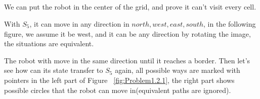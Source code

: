 \documentclass[paper=a4, fontsize=11pt]{scrartcl} %
\numberwithin{equation}{section} %
\numberwithin{figure}{section} %
\numberwithin{table}{section} %
\begin{document}

\subsection{}

We can put the robot in the center of the grid, and prove it can't visit every cell.

With $S_5$, it can move in any direction in ${north, west, east, south}$, in the following figure, 
we assume it be west, and it can be any direction by rotating the image, 
the situations are equivalent.

The robot with move in the same direction until it reaches a border.
Then let's see how can its state transfer to $S_5$ again,
all possible ways are marked with pointers in the left part of Figure ~\ref{fig:Problem1.2.1}, 
the right part shows possible circles that the robot can move in(equivalent paths are ignored).\\
    
\end{document}

